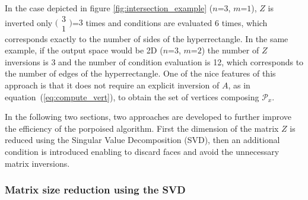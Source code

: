 In the case depicted in figure \ref{fig:intersection_example} ($n$=$3$, $m$=$1$), $Z$ is inverted only $\big(\begin{smallmatrix}3\\1\end{smallmatrix}\big)$=$3$ times and conditions are evaluated 6 times, which corresponds exactly to the number of sides of the hyperrectangle. In the same example, if the output space would be 2D ($n$=$3$, $m$=$2$) the number of $Z$ inversions is 3 and the number of condition evaluation is 12, which corresponds to the number of edges of the hyperrectangle. One of the nice features of this approach is that it does not require an explicit inversion of $A$, as in equation~(\ref{eq:compute_vert}), to obtain the set of vertices composing $\mathcal{P}_x$.

In the following two sections, two approaches are developed to further improve the efficiency of the porpoised algorithm. First the dimension of the matrix $Z$ is reduced using the Singular Value Decomposition (SVD), then an additional condition is introduced enabling to discard faces and avoid the unnecessary matrix inversions.

\subsubsection{Matrix size reduction using the SVD}

